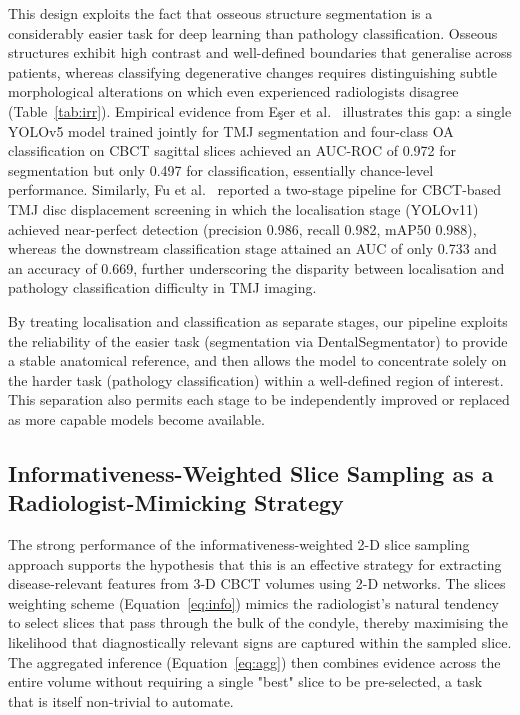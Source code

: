 \documentclass[review,12pt]{elsarticle}
\begin{document}
This design exploits the fact that osseous structure segmentation is a considerably
easier task for deep learning than pathology classification. Osseous
structures exhibit high contrast and well-defined boundaries that
generalise across patients, whereas classifying degenerative changes
requires distinguishing subtle morphological alterations on which even
experienced radiologists disagree (Table~\ref{tab:irr}). Empirical evidence from E\c{s}er et al.~\cite{ecser2023classification}
illustrates this gap: a single YOLOv5 model trained jointly for TMJ
segmentation and four-class OA classification on CBCT sagittal slices
achieved an AUC-ROC of 0.972 for segmentation but only
0.497 for classification, essentially chance-level performance. Similarly, Fu et al.~\cite{fu2026cbct} reported a two-stage pipeline
for CBCT-based TMJ disc displacement screening in which the
localisation stage (YOLOv11) achieved near-perfect detection
(precision 0.986, recall 0.982, mAP50 0.988), whereas the downstream
classification stage attained an AUC of only 0.733 and an accuracy of
0.669, further underscoring the disparity between localisation and
pathology classification difficulty in TMJ imaging.

By treating localisation and classification as separate stages, our
pipeline exploits the reliability of the easier task (segmentation via
DentalSegmentator) to provide a stable anatomical reference, and then allows the model to concentrate solely on the harder task (pathology classification) within a well-defined region of interest. This
separation also permits each stage to be independently improved or
replaced as more capable models become available.

\subsection{Informativeness-Weighted Slice Sampling as a Radiologist-Mimicking Strategy}

The strong performance of the informativeness-weighted
2-D slice sampling approach supports the hypothesis that this is an effective strategy for extracting
disease-relevant features from 3-D CBCT volumes using 2-D networks. The slices weighting scheme (Equation~\ref{eq:info}) mimics the radiologist's
natural tendency to select slices that pass through the bulk of the
condyle, thereby maximising the likelihood that diagnostically relevant
signs are captured within the sampled slice. The aggregated
inference (Equation~\ref{eq:agg}) then combines evidence across the
entire volume without requiring a single "best" slice to be
pre-selected, a task that is itself non-trivial to automate.
\end{document}
